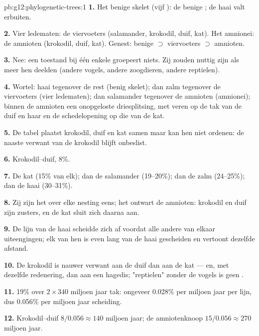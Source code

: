 \begin{solution}{pb:g12:phylogenetic-trees:1}
\textbf{1.} Het benige skelet (vijf ): de benige ; de
haai valt erbuiten.

\textbf{2.} Vier ledematen: de viervoeters (salamander, krokodil, duif,
kat). Het amnionei: de amnioten (krokodil, duif, kat). Genest: benige
 $\supset$ viervoeters $\supset$ amnioten.

\textbf{3.} Nee: een toestand bij één enkele  groepeert niets. Zij
zouden nuttig zijn als meer  hen deelden (andere vogels, andere
zoogdieren, andere reptielen).

\textbf{4.} Wortel: haai tegenover de rest (benig skelet); dan zalm
tegenover de viervoeters (vier ledematen); dan salamander tegenover de
amnioten (amnionei); binnen de amnioten een onopgeloste driesplitsing, met
veren op de tak van de duif en haar en de schedelopening op die van de
kat.

\textbf{5.} De tabel plaatst krokodil, duif en kat samen maar kan hen niet
ordenen: de naaste verwant van de krokodil blijft onbeslist.

\textbf{6.} Krokodil--duif, 8\%.

\textbf{7.} De kat (15\% van elk); dan de salamander (19--20\%); dan de
zalm (24--25\%); dan de haai (30--31\%).

\textbf{8.} Zij zijn het over elke nesting eens; het  ontwart de
amnioten: krokodil en duif zijn zusters, en de kat sluit zich daarna aan.

\textbf{9.} De lijn van de haai scheidde zich af voordat alle andere van
elkaar uiteengingen; elk van hen is even lang van de haai gescheiden en
vertoont dezelfde afstand.

\textbf{10.} De krokodil is nauwer verwant aan de duif dan aan de kat ---
en, met dezelfde redenering, dan aan een hagedis; "reptielen" zonder de
vogels is geen .

\textbf{11.} 19\% over $2 \times 340$ miljoen jaar tak: ongeveer 0.028\%
per miljoen jaar per lijn, dus 0.056\% per miljoen jaar scheiding.

\textbf{12.} Krokodil--duif $8/0.056 \approx 140$ miljoen jaar; de
amniotenknoop $15/0.056 \approx 270$ miljoen jaar.


\end{solution}
